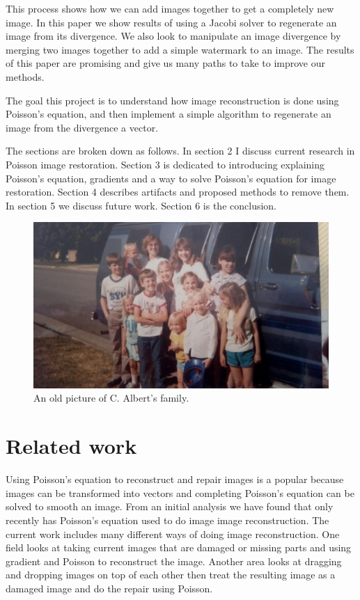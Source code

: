 \documentclass[10pt,twopage]{acmsiggraph}
\begin{document}
This process shows how we can add images together to get a completely new image. In this paper we show results of using a Jacobi solver to regenerate an image from its divergence. We also look to manipulate an image divergence by merging two images together to add a simple watermark to an image. The results of this paper are promising and give us many paths to take to improve our methods.

The goal this project is to understand how image reconstruction is done using Poisson's equation, and then implement a simple algorithm to regenerate an image from the divergence a vector. 

The sections are broken down as follows. In section 2 I discuss current research in Poisson image restoration. Section 3 is dedicated to introducing explaining Poisson's equation, gradients and a way to solve Poisson's equation for image restoration. Section 4 describes artifacts and proposed methods to remove them. In section 5 we discuss future work. Section 6 is the conclusion.
 
\begin{figure}
\centering
\includegraphics[width=.44\textwidth]{fig/family.jpg}
\caption{An old picture of C. Albert's family.}
\label{family}
\end{figure}

\section{Related work}
\label{relatedWork}
Using Poisson's equation to reconstruct and repair images is a popular because images can be transformed into vectors and completing Poisson's equation can be solved to smooth an image. From an initial analysis we have found that only recently \cite{Bertalmio} has Poisson's equation used to do image image reconstruction. The current work includes many different ways of doing image reconstruction. One field looks at taking current images that are damaged or missing parts and using gradient and Poisson to reconstruct the image. Another area looks at dragging and dropping images on top of each other then treat the resulting image as a damaged image and do the repair using Poisson.
\end{document}
